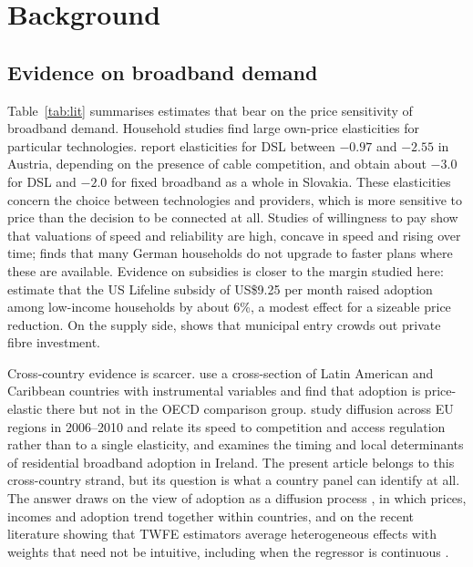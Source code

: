\documentclass[pdflatex,sn-basic]{sn-jnl}
\begin{document}
\section{Background}\label{sec:background}

\subsection{Evidence on broadband demand}

Table~\ref{tab:lit} summarises estimates that bear on the price sensitivity of broadband demand. Household studies find large own-price elasticities for particular technologies. \citet{cardona2009demand} report elasticities for DSL between $-0.97$ and $-2.55$ in Austria, depending on the presence of cable competition, and \citet{grzybowski2014market} obtain about $-3.0$ for DSL and $-2.0$ for fixed broadband as a whole in Slovakia. These elasticities concern the choice between technologies and providers, which is more sensitive to price than the decision to be connected at all. Studies of willingness to pay \citep{rosston2010household,liu2018distinguishing,sinclair2023assessing} show that valuations of speed and reliability are high, concave in speed and rising over time; \citet{lindlacher2021low} finds that many German households do not upgrade to faster plans where these are available. Evidence on subsidies is closer to the margin studied here: \citet{mendez2021lifeline} estimate that the US Lifeline subsidy of US\$9.25 per month raised adoption among low-income households by about 6\%, a modest effect for a sizeable price reduction. On the supply side, \citet{wilson2025public} shows that municipal entry crowds out private fibre investment.

Cross-country evidence is scarcer. \citet{galperin2013price} use a cross-section of Latin American and Caribbean countries with instrumental variables and find that adoption is price-elastic there but not in the OECD comparison group. \citet{dauvin2014estimating} study diffusion across EU regions in 2006--2010 and relate its speed to competition and access regulation rather than to a single elasticity, and \citet{lyons2014timing} examines the timing and local determinants of residential broadband adoption in Ireland. The present article belongs to this cross-country strand, but its question is what a country panel can identify at all. The answer draws on the view of adoption as a diffusion process \citep{griliches1957hybrid,geroski2000models,comin2010exploration}, in which prices, incomes and adoption trend together within countries, and on the recent literature showing that TWFE estimators average heterogeneous effects with weights that need not be intuitive, including when the regressor is continuous \citep{dechaisemartin2020two,goodman2021difference,callaway2024difference}.
\end{document}
